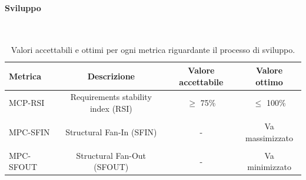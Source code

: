 \documentclass[8pt]{article}
\newcommand{\subsubsubsection}[1]{\paragraph{#1}\mbox{}\\}
\begin{document}
\clearpage
\subsubsubsection{Sviluppo}
\begin{table}[h]	
	\centering
	\begin{tabular}{lccc}
		\toprule
		\textbf{Metrica}& \textbf{Descrizione} & \textbf{Valore accettabile} & \textbf{Valore ottimo} \\
		\midrule
		MCP-RSI & Requirements stability index (RSI) & $\geq $ 75\%  & $\leq$ 100\% \\\\
		MPC-SFIN & Structural Fan-In (SFIN) & - & Va massimizzato\\\\
		MPC-SFOUT & Structural Fan-Out (SFOUT) & - & Va minimizzato\\
		\bottomrule
	\end{tabular}
	\caption{Valori accettabili e ottimi per ogni metrica riguardante il processo di sviluppo.}
	\label{table:Valori accettabili e ottimi per ogni metrica riguardante il processo di sviluppo.}
\end{table}
\end{document}
